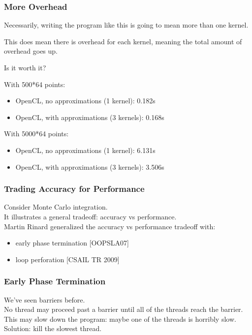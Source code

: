 \begin{frame}
\frametitle{More Overhead}

Necessarily, writing the program like this is going to mean more than one kernel.

This does mean there is overhead for each kernel, meaning the total amount of overhead goes up. 

Is it worth it? 

With 500*64 points:
\begin{itemize}
\item    OpenCL, no approximations (1 kernel): 0.182s
\item    OpenCL, with approximations (3 kernels): 0.168s
\end{itemize}

With 5000*64 points:
\begin{itemize}
\item    OpenCL, no approximations (1 kernel): 6.131s
\item    OpenCL, with approximations (3 kernels): 3.506s
\end{itemize}


\end{frame}




\begin{frame}
  \frametitle{Trading Accuracy for Performance}


    Consider Monte Carlo integration.\\
    It illustrates a general tradeoff: accuracy vs performance.\\
  
    Martin Rinard generalized the accuracy vs performance tradeoff with:
      \begin{itemize}
        \item early phase termination [OOPSLA07]
        \item loop perforation [CSAIL TR 2009]
      \end{itemize}

\end{frame}


\begin{frame}
  \frametitle{Early Phase Termination}



  We've seen barriers before.\\

  No thread may proceed past a barrier until all of the threads
reach the barrier.\\[1em]

  This may slow down the program: maybe one of the threads is horribly
  slow.\\[1em]

  Solution: kill the slowest thread.


\end{frame}

